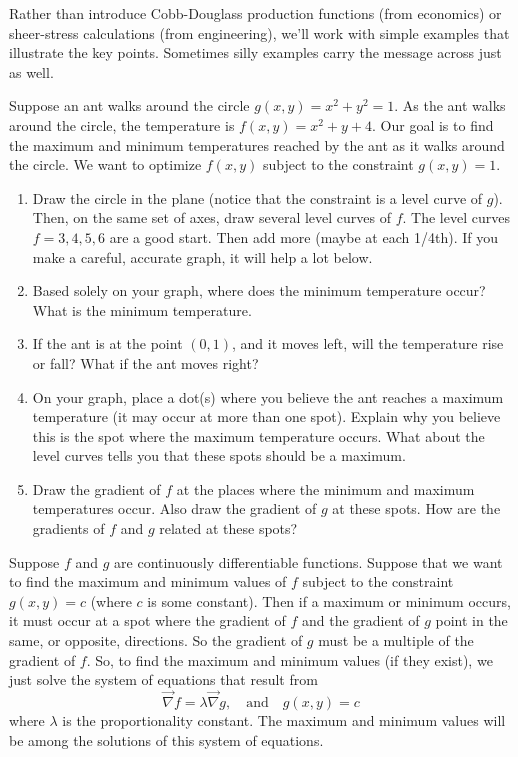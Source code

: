 Rather than introduce Cobb-Douglass production functions (from economics) or sheer-stress calculations (from engineering), we'll work with simple examples that illustrate the key points.  Sometimes silly examples carry the message across just as well.

\begin{problem}
 Suppose an ant walks around the circle $g(x,y)=x^2+y^2=1$.  As the ant walks around the circle, the temperature is $f(x,y) = x^2+y+4$.  Our goal is to find the maximum and minimum temperatures reached by the ant as it walks around the circle. We want to optimize $f(x,y)$ subject to the constraint $g(x,y)=1$. 
 \begin{enumerate}
  \item Draw the circle in the plane (notice that the constraint is a level curve of $g$).  Then, on the same set of axes, draw several level curves of $f$. The level curves $f=3, 4, 5, 6$ are a good start. Then add more (maybe at each 1/4th). If you make a careful, accurate graph, it will help a lot below.
  \item Based solely on your graph, where does the minimum temperature occur?  What is the minimum temperature.
  \item If the ant is at the point $(0,1)$, and it moves left, will the temperature rise or fall?  What if the ant moves right? 
  \item On your graph, place a dot(s) where you believe the ant reaches a maximum temperature (it may occur at more than one spot). Explain why you believe this is the spot where the maximum temperature occurs. What about the level curves tells you that these spots should be a maximum.
  \item Draw the gradient of $f$ at the places where the minimum and maximum temperatures occur. Also draw the gradient of $g$ at these spots.  How are the gradients of $f$ and $g$ related at these spots?
 \end{enumerate}
\end{problem}

\begin{theorem}
Suppose $f$ and $g$ are continuously differentiable functions. Suppose that we want to find the maximum and minimum values of $f$ subject to the constraint $g(x,y)=c$ (where $c$ is some constant).  Then if a maximum or minimum occurs, it must occur at a spot where the gradient of $f$ and the gradient of $g$ point in the same, or opposite, directions. So the gradient of $g$ must be a multiple of the gradient of $f$. So, to find the maximum and minimum values (if they exist), we just solve the system of equations that result from  
$$\vec \nabla f = \lambda \vec \nabla g,\quad \text{and}\quad g(x,y)=c$$ where $\lambda$ is the proportionality constant. The maximum and minimum values will be among the solutions of this system of equations. 
\end{theorem}

